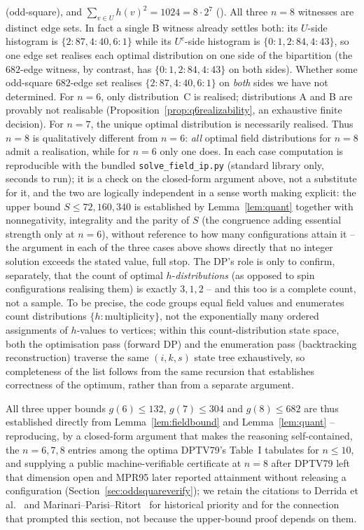 \documentclass[12pt,a4paper]{article}
\theoremstyle{definition}
\begin{document}
(odd-square), and $\sum_{v\in U}h(v)^2=1024=8\cdot2^7$ (\checkmark). All
three $n=8$ witnesses are distinct edge sets. In fact a single B witness
already settles both: its $U$-side histogram is $\{2{:}87,4{:}40,6{:}1\}$ while
its $U^{c}$-side histogram is $\{0{:}1,2{:}84,4{:}43\}$, so one edge set
realises each optimal distribution on one side of the bipartition (the
$682$-edge witness, by contrast, has $\{0{:}1,2{:}84,4{:}43\}$ on both sides).
Whether some odd-square $682$-edge set realises $\{2{:}87,4{:}40,6{:}1\}$ on
\emph{both} sides we have not determined.
For $n=6$, only distribution~C is realised;
distributions A and B are provably not realisable
(Proposition~\ref{prop:q6realizability}, an exhaustive finite decision).
For $n=7$, the unique optimal distribution is necessarily realised. Thus $n=8$
is qualitatively different from $n=6$: \emph{all} optimal field distributions
for $n=8$ admit a realisation, while for $n=6$ only one does. In each case
computation is reproducible with the bundled
\texttt{solve\_field\_ip.py} (standard library only, seconds to run);
it is a check on the closed-form argument above, not a substitute for
it, and the two are logically independent in a sense worth making
explicit: the upper bound $S\le72,160,340$ is established by
Lemma~\ref{lem:quant} together with nonnegativity, integrality and the
parity of $S$ (the congruence adding essential strength only at $n=6$),
without reference to how many configurations attain it -- the argument
in each of the three cases above shows directly that no integer
solution exceeds the stated value, full stop. The DP's role is only to
confirm, separately, that the count of optimal $h$-\emph{distributions}
(as opposed to spin configurations realising them) is exactly $3,1,2$
-- and this too is a complete count, not a sample. To be precise, the
code groups equal field values and enumerates count distributions
$\{h{:}\text{multiplicity}\}$, not the exponentially many ordered
assignments of $h$-values to vertices; within this count-distribution
state space, both the optimisation pass (forward DP) and the
enumeration pass (backtracking reconstruction) traverse the same
$(i,k,s)$ state tree exhaustively, so completeness of the list follows
from the same recursion that establishes correctness of the optimum,
rather than from a separate argument.

All three upper bounds $g(6)\le132$, $g(7)\le304$ and $g(8)\le682$ are thus established
directly from Lemma~\ref{lem:fieldbound} and Lemma~\ref{lem:quant} --
reproducing, by a closed-form argument that makes the reasoning self-contained, the
$n=6,7,8$ entries among the optima DPTV79's Table~I tabulates for
$n\le10$, and supplying
a public machine-verifiable certificate at $n=8$ after DPTV79 left that
dimension open and MPR95 later reported attainment without releasing a
configuration (Section~\ref{sec:oddsquareverify}); we retain the citations to
Derrida et al.~\cite{DPTV79} and Marinari--Parisi--Ritort~\cite{MPR95}
for historical priority and for the connection that prompted this
section, not because the upper-bound
proof depends on them.
\end{document}
